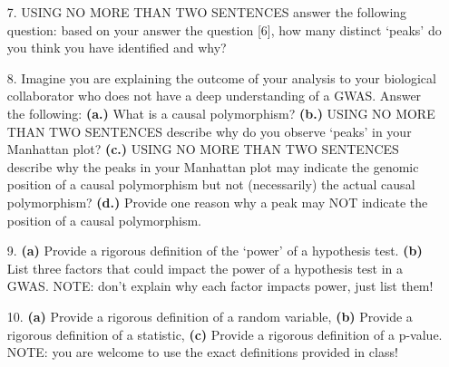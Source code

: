 \documentclass[letterpaper, 11pt]{article}
\begin{document}
\begin{itemize}
\item[7.]  USING NO MORE THAN TWO SENTENCES answer the following question: based on your answer the question [6], how many distinct `peaks' do you think you have identified and why? 

\item[8.] Imagine you are explaining the outcome of your analysis to your biological collaborator who does not have a deep understanding of a GWAS.  Answer the following: \textbf{(a.)} What is a causal polymorphism?  \textbf{(b.)} USING NO MORE THAN TWO SENTENCES describe why do you observe `peaks' in your Manhattan plot? \textbf{(c.)} USING NO MORE THAN TWO SENTENCES describe why the peaks in your Manhattan plot may indicate the genomic position of a causal polymorphism but not (necessarily) the actual causal polymorphism? \textbf{(d.)} Provide one reason why a peak may NOT indicate the position of a causal polymorphism.

\item[9.]  \textbf{(a)} Provide a rigorous definition of the `power' of a hypothesis test. \textbf{(b)} List three factors that could impact the power of a hypothesis test in a GWAS.  NOTE: don't explain why each factor impacts power, just list them!

\item[10.] \textbf{(a)} Provide a rigorous definition of a random variable, \textbf{(b)} Provide a rigorous definition of a statistic, \textbf{(c)} Provide a rigorous definition of a p-value.  NOTE: you are welcome to use the exact definitions provided in class!

\end{itemize}
\end{document}
